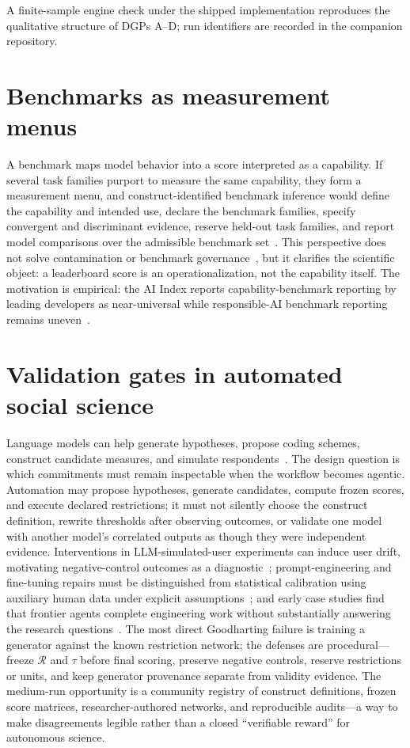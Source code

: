 \documentclass[10pt,letterpaper]{article}
\newcommand{\Rset}{\mathcal{R}}
\begin{document}
A finite-sample engine check under the shipped implementation reproduces the qualitative structure of DGPs A--D; run identifiers are recorded in the companion repository.

\section{Benchmarks as measurement menus}
\label{app:bench}

A benchmark maps model behavior into a score interpreted as a capability.
If several task families purport to measure the same capability, they form a measurement menu, and construct-identified benchmark inference would define the capability and intended use, declare the benchmark families, specify convergent and discriminant evidence, reserve held-out task families, and report model comparisons over the admissible benchmark set~\cite{wallach2025,bean2025}.
This perspective does not solve contamination or benchmark governance~\cite{truong2026}, but it clarifies the scientific object: a leaderboard score is an operationalization, not the capability itself.
The motivation is empirical: the AI Index reports capability-benchmark reporting by leading developers as near-universal while responsible-AI benchmark reporting remains uneven~\cite{hai2026}.

\section{Validation gates in automated social science}
\label{app:automation}

Language models can help generate hypotheses, propose coding schemes, construct candidate measures, and simulate respondents~\cite{manning2024}.
The design question is which commitments must remain inspectable when the workflow becomes agentic.
Automation may propose hypotheses, generate candidates, compute frozen scores, and execute declared restrictions; it must not silently choose the construct definition, rewrite thresholds after observing outcomes, or validate one model with another model's correlated outputs as though they were independent evidence.
Interventions in LLM-simulated-user experiments can induce user drift, motivating negative-control outcomes as a diagnostic~\cite{illusion2026}; prompt-engineering and fine-tuning repairs must be distinguished from statistical calibration using auxiliary human data under explicit assumptions~\cite{hullman2026}; and early case studies find that frontier agents complete engineering work without substantially answering the research questions~\cite{kirgis2026}.
The most direct Goodharting failure is training a generator against the known restriction network; the defenses are procedural---freeze $\Rset$ and $\tau$ before final scoring, preserve negative controls, reserve restrictions or units, and keep generator provenance separate from validity evidence.
The medium-run opportunity is a community registry of construct definitions, frozen score matrices, researcher-authored networks, and reproducible audits---a way to make disagreements legible rather than a closed ``verifiable reward'' for autonomous science.
\end{document}
